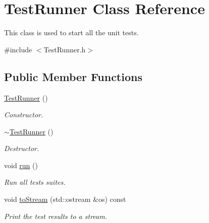 \hypertarget{classTestRunner}{
\section{TestRunner Class Reference}
\label{classTestRunner}
}


This class is used to start all the unit tests.  




{\ttfamily \#include $<$TestRunner.h$>$}

\subsection*{Public Member Functions}
\begin{DoxyCompactItemize}
\item 
\hypertarget{classTestRunner_adf6d073e739128299841d29a6701d34b}{
\hyperlink{classTestRunner_adf6d073e739128299841d29a6701d34b}{TestRunner} ()}
\label{classTestRunner_adf6d073e739128299841d29a6701d34b}

\begin{DoxyCompactList}\small\item\em Constructor. \item\end{DoxyCompactList}\item 
\hypertarget{classTestRunner_a121456d7e522c0d83d648a0118ec0c6f}{
\hyperlink{classTestRunner_a121456d7e522c0d83d648a0118ec0c6f}{$\sim$TestRunner} ()}
\label{classTestRunner_a121456d7e522c0d83d648a0118ec0c6f}

\begin{DoxyCompactList}\small\item\em Destructor. \item\end{DoxyCompactList}\item 
\hypertarget{classTestRunner_a692f0bb1327c4092398b95c27ec6957b}{
void \hyperlink{classTestRunner_a692f0bb1327c4092398b95c27ec6957b}{run} ()}
\label{classTestRunner_a692f0bb1327c4092398b95c27ec6957b}

\begin{DoxyCompactList}\small\item\em Run all tests suites. \item\end{DoxyCompactList}\item 
void \hyperlink{classTestRunner_a5d3932d4614f12c9fca2870597b90e1d}{toStream} (std::ostream \&os) const 
\begin{DoxyCompactList}\small\item\em Print the test results to a stream. \item\end{DoxyCompactList}\end{DoxyCompactItemize}


